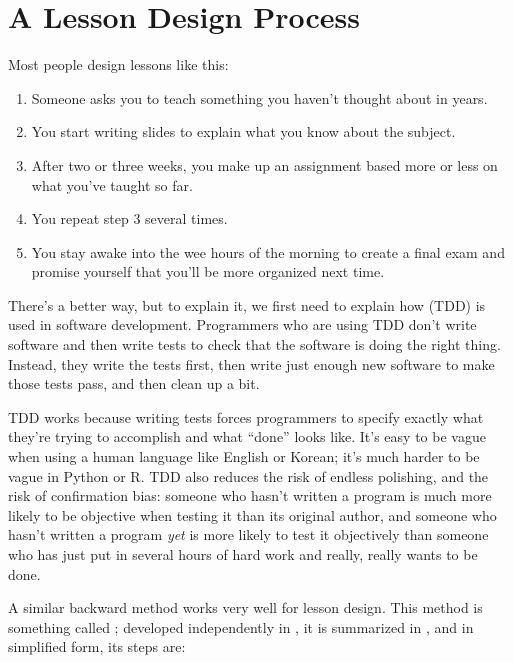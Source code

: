 \chapter{A Lesson Design Process}\label{s:process}

Most people design lessons like this:

\begin{enumerate}
\item
  Someone asks you to teach something you haven't thought about in
  years.
\item
  You start writing slides to explain what you know about the subject.
\item
  After two or three weeks, you make up an assignment based more or
  less on what you've taught so far.
\item
  You repeat step 3 several times.
\item
  You stay awake into the wee hours of the morning to create a final
  exam and promise yourself that you'll be more organized next time.
\end{enumerate}

There's a better way, but to explain it, we first need to explain how
 (TDD)
is used in software development. Programmers who are using TDD don't
write software and then write tests to check that the software is
doing the right thing. Instead, they write the tests first, then write
just enough new software to make those tests pass, and then clean up a
bit.

TDD works because writing tests forces programmers to specify exactly
what they're trying to accomplish and what ``done'' looks like. It's
easy to be vague when using a human language like English or Korean;
it's much harder to be vague in Python or R. TDD also reduces the risk
of endless polishing, and the risk of confirmation bias: someone who
hasn't written a program is much more likely to be objective when
testing it than its original author, and someone who hasn't written a
program \emph{yet} is more likely to test it objectively than someone who
has just put in several hours of hard work and really, really wants to
be done.

A similar backward method works very well for lesson design. This
method is something called ;
developed independently in
\cite{Wigg2005,Bigg2011,Fink2013}, it is
summarized in \cite{McTi2013}, and in simplified form, its steps
are:

